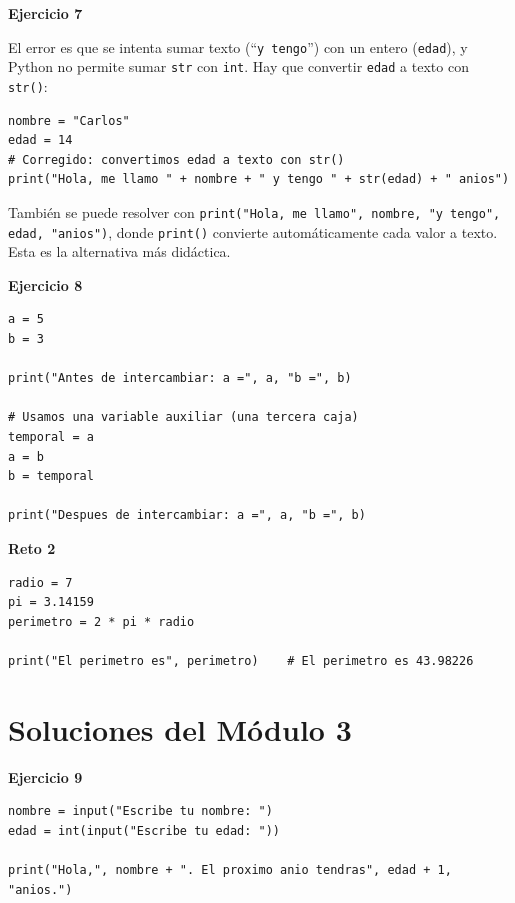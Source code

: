 \documentclass[12pt,a4paper]{article}
\begin{document}
\begin{cajaSolucion}
\textbf{Ejercicio 7}

El error es que se intenta sumar texto (``\texttt{y tengo}'') con un entero (\texttt{edad}), y Python no permite sumar \texttt{str} con \texttt{int}. Hay que convertir \texttt{edad} a texto con \texttt{str()}:
\begin{lstlisting}[style=pythonStyle]
nombre = "Carlos"
edad = 14
# Corregido: convertimos edad a texto con str()
print("Hola, me llamo " + nombre + " y tengo " + str(edad) + " anios")
\end{lstlisting}

\begin{cajaNota}
También se puede resolver con \texttt{print("Hola, me llamo", nombre, "y tengo", edad, "anios")}, donde \texttt{print()} convierte automáticamente cada valor a texto. Esta es la alternativa más didáctica.
\end{cajaNota}
\end{cajaSolucion}

\begin{cajaSolucion}
\textbf{Ejercicio 8}
\begin{lstlisting}[style=pythonStyle]
a = 5
b = 3

print("Antes de intercambiar: a =", a, "b =", b)

# Usamos una variable auxiliar (una tercera caja)
temporal = a
a = b
b = temporal

print("Despues de intercambiar: a =", a, "b =", b)
\end{lstlisting}
\end{cajaSolucion}

\begin{cajaSolucion}
\textbf{Reto 2}
\begin{lstlisting}[style=pythonStyle]
radio = 7
pi = 3.14159
perimetro = 2 * pi * radio

print("El perimetro es", perimetro)    # El perimetro es 43.98226
\end{lstlisting}
\end{cajaSolucion}

\section{Soluciones del Módulo 3}

\begin{cajaSolucion}
\textbf{Ejercicio 9}
\begin{lstlisting}[style=pythonStyle]
nombre = input("Escribe tu nombre: ")
edad = int(input("Escribe tu edad: "))

print("Hola,", nombre + ". El proximo anio tendras", edad + 1, "anios.")
\end{lstlisting}
\end{cajaSolucion}
\end{document}
